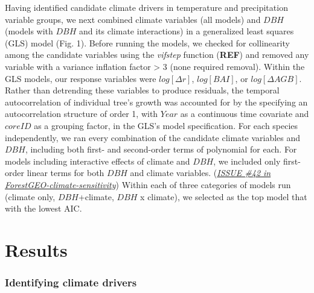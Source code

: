 \documentclass[
]{article}
\begin{document}
Having identified candidate climate drivers in temperature and
precipitation variable groups, we next combined climate variables (all
models) and \(DBH\) (models with \(DBH\) and its climate interactions)
in a generalized least squares (GLS) model (Fig. 1). Before running the
models, we checked for collinearity among the candidate variables using
the \emph{vifstep} function (\textbf{REF}) and removed any variable with
a variance inflation factor \textgreater{} 3 (none required removal).
Within the GLS models, our response variables were \(log[\Delta r]\),
\(log[BAI]\), or \(log[\Delta AGB]\). Rather than detrending these
variables to produce residuals, the temporal autocorrelation of
individual tree's growth was accounted for by the specifying an
autocorrelation structure of order 1, with \(Year\) as a continuous time
covariate and \(coreID\) as a grouping factor, in the GLS's model
specification. For each species independently, we ran every combination
of the candidate climate variables and \(DBH\), including both first-
and second-order terms of polynomial for each. For models including
interactive effects of climate and \(DBH\), we included only first-order
linear terms for both \(DBH\) and climate variables.
(\emph{\href{https://github.com/EcoClimLab/ForestGEO-climate-sensitivity/issues/42}{ISSUE
\#42 in ForestGEO-climate-sensitivity}}) Within each of three categories
of models run (climate only, \(DBH\)+climate, \(DBH\) x climate), we
selected as the top model that with the lowest AIC.

\hypertarget{results}{%
\section{Results}\label{results}}

\hypertarget{identifying-climate-drivers}{%
\subsubsection{Identifying climate
drivers}\label{identifying-climate-drivers}}
\end{document}
